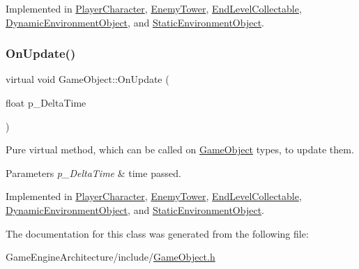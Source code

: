 Implemented in \mbox{\hyperlink{class_player_character_a7185322cbdc51cc339bfcada0c8fdb29}{Player\+Character}}, \mbox{\hyperlink{class_enemy_tower_aa717457559bfba3b6e9f932d71c97831}{Enemy\+Tower}}, \mbox{\hyperlink{class_end_level_collectable_aabbe03b0e87e7dbc04948b022f399de0}{End\+Level\+Collectable}}, \mbox{\hyperlink{class_dynamic_environment_object_a9803c4f8381f8812976cd016f86aaffd}{Dynamic\+Environment\+Object}}, and \mbox{\hyperlink{class_static_environment_object_afa722f23bf3c503edcacc60efec3f692}{Static\+Environment\+Object}}.

\mbox{\label{class_game_object_a3d4444ab3efd5e3041014da90a66c081}} 
\subsubsection{\texorpdfstring{OnUpdate()}{OnUpdate()}}
{\footnotesize\ttfamily virtual void Game\+Object\+::\+On\+Update (\begin{DoxyParamCaption}\item[{float}]{p\+\_\+\+Delta\+Time }\end{DoxyParamCaption})\hspace{0.3cm}{\ttfamily [pure virtual]}}



Pure virtual method, which can be called on \mbox{\hyperlink{class_game_object}{Game\+Object}} types, to update them. 


\begin{DoxyParams}{Parameters}
{\em p\+\_\+\+Delta\+Time} & time passed. \\
\hline
\end{DoxyParams}


Implemented in \mbox{\hyperlink{class_player_character_a8b2f1ccb7f3ae744f9ecb9a80537e5ee}{Player\+Character}}, \mbox{\hyperlink{class_enemy_tower_ab3ada6dea5a4020a48c2764315767aec}{Enemy\+Tower}}, \mbox{\hyperlink{class_end_level_collectable_a6d04aaa0751a21b0d4922339d6524887}{End\+Level\+Collectable}}, \mbox{\hyperlink{class_dynamic_environment_object_a74f519772b818b7f82abec0a70ca59ce}{Dynamic\+Environment\+Object}}, and \mbox{\hyperlink{class_static_environment_object_accbe302e081137786ee1958d657f0271}{Static\+Environment\+Object}}.



The documentation for this class was generated from the following file\+:\begin{DoxyCompactItemize}
\item 
Game\+Engine\+Architecture/include/\mbox{\hyperlink{_game_object_8h}{Game\+Object.\+h}}\end{DoxyCompactItemize}
